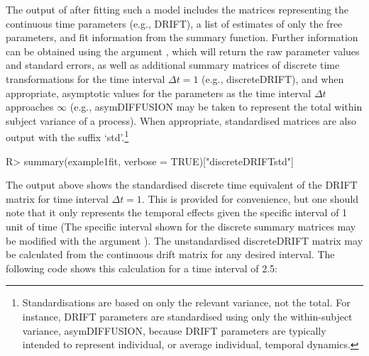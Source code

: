 \documentclass[nojss]{jss}\usepackage[]{graphicx}\usepackage[]{color}
\begin{document}
The output of  after fitting such a model includes the matrices representing the continuous time parameters (e.g., DRIFT), a list of estimates of only the free parameters, and fit information from the  summary function. Further information can be obtained using the argument , which will return the raw  parameter values and standard errors, as well as additional summary matrices of discrete time transformations for the time interval $\Delta t = 1$ (e.g., discreteDRIFT), and when appropriate, asymptotic values for the parameters as the time interval $\Delta t$ approaches $\infty $ (e.g., asymDIFFUSION may be taken to represent the total within subject variance of a process). When appropriate, standardised matrices are also output with the suffix `std'.\footnote{Standardisations are based on only the relevant variance, not the total. For instance, DRIFT parameters are standardised using only the within-subject variance, asymDIFFUSION, because DRIFT parameters are typically intended to represent individual, or average individual, temporal dynamics.}   

\begin{Schunk}
\begin{Sinput}
R> summary(example1fit, verbose = TRUE)["discreteDRIFTstd"]
\end{Sinput}
\end{Schunk}

The output above shows the standardised discrete time equivalent of the DRIFT matrix for time interval $\Delta t = 1$. This is provided for convenience, but one should note that it only represents the temporal effects given the specific interval of 1 unit of time (The specific interval shown for the discrete summary matrices may be modified with the argument ).  The unstandardised discreteDRIFT matrix may be calculated from the continuous drift matrix for any desired interval. The following code shows this calculation for a time interval of 2.5: 

\begin{Schunk}
\end{Schunk}
\end{document}
